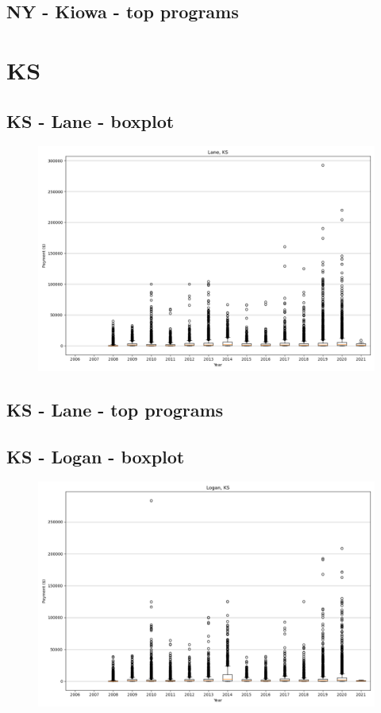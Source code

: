 \subsection*{NY - Kiowa - top programs}

\newpage
\section*{KS}
\subsection*{KS - Lane - boxplot}
\begin{figure}[h]
\centering
\includegraphics[width=7in]{../output/boxplots/counties/Lane-KS_boxplot.png}
\end{figure}


\subsection*{KS - Lane - top programs}

\newpage
\subsection*{KS - Logan - boxplot}
\begin{figure}[h]
\centering
\includegraphics[width=7in]{../output/boxplots/counties/Logan-KS_boxplot.png}
\end{figure}



